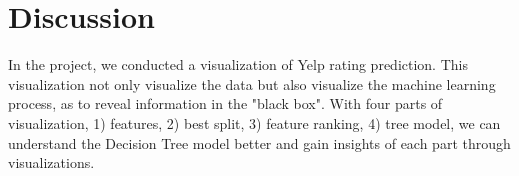 \documentclass{vgtc}                          %
\begin{document}
\section{Discussion}

In the project, we conducted a visualization of Yelp rating prediction. This visualization not only visualize the data but also visualize the machine learning process, as to reveal information in the "black box". With four parts of visualization, 1) features, 2) best split, 3) feature ranking, 4) tree model, we can understand the Decision Tree model better and gain insights of each part through visualizations. 


%

%
%
%


\end{document}
